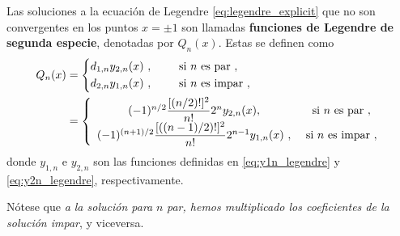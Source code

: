 \begin{defi}
    Las soluciones a la ecuación de Legendre \eqref{eq:legendre_explicit} que no son convergentes en los puntos $x = \pm 1$ son llamadas \textbf{funciones de Legendre de segunda especie}, denotadas por $Q_n(x)$. Estas se definen como
    \begin{align} \label{eq:legendre-second-kind}
        Q_n(x) & = \begin{dcases}
            d_{1,n} y_{2,n}(x) \ , \qquad \text{ si } n \text{ es par} \ , \\
            d_{2,n} y_{1,n}(x) \ , \qquad \text{ si } n \text{ es impar} \ ,
        \end{dcases} \\
        & = \left\{ \begin{array}{cc}
            (-1)^{n/2} \dfrac{[(n/2)!]^2}{n!} 2^n y_{2,n}(x) , & \text{ si } n \text{ es par} \ , \\
            (-1)^{(n+1)/2} \dfrac{[\left((n-1)/2\right)!]^2}{n!} 2^{n-1} y_{1,n}(x) \ , & \text{ si } n \text{ es impar} \ ,
        \end{array} \right.
    \end{align}
    donde $y_{1,n}$ e $y_{2,n}$ son las funciones definidas en \eqref{eq:y1n_legendre} y \eqref{eq:y2n_legendre}, respectivamente. 
    
    Nótese que \emph{a la solución para} $n$ \emph{par, hemos multiplicado los coeficientes de la solución impar}, y viceversa.
\end{defi}



